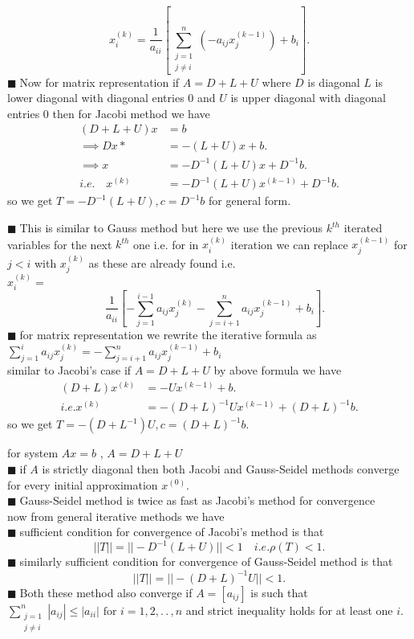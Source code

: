 \documentclass[11pt]{extarticle}
\newcommand{\ck}{.\,.\,}
\newcommand{\sm}[2]{\displaystyle\sum_{#1}^{#2}}
\newcommand{\tbx}[2][]{
\begin{tcolorbox}[enhanced,breakable,size=small,colback=black!2!white,title={#1},arc is angular, arc=1.5mm,drop fuzzy shadow]
	#2
\end{tcolorbox}
}
\newcommand{\y}{$\blacksquare\;$}
\begin{document}
\begin{multicols}{2}
{				\[ x_i^{(k)}=\frac{ 1 }{a_{ii}} \left[\sm{\substack{j=1 \\ j\neq i}}{n}(-a_{ij}x_j^{(k-1)}) +b_i\right].\]
				 \y Now for matrix representation if $ A=D+L+U $ where $ D $ is diagonal $ L $ is lower diagonal with diagonal entries $ 0 $ and $ U $ is upper diagonal with diagonal entries $ 0 $ then for Jacobi method we have 
				 \begin{align*}
				 	(D+L+U)x&=b\\
				 	\implies Dx*&= -(L+U)x+b.\\
				 	\implies x&=-D^{-1}(L+U)x+D^{-1}b.\\
				 	i.e. \quad x^{(k)}&=-D^{-1}(L+U)x^{(k-1)}+D^{-1}b.
				 	\end{align*}  
			 	so we get $ T=-D^{-1}(L+U),c=D^{-1}b $ for general form.}
				 \tbx[Gauss-Seidel Method]{ \y This is similar to Gauss method but here we use the previous $ k^{th} $ iterated variables for the next $ k^{th} $ one  i.e. for in $ x_i^{(k)} $ iteration we can replace $ x_j^{(k-1)} $ for $ j<i $ with $ x_j^{(k)} $ as these are already found i.e.\\
				 	 $x_i^{(k)}=$
				 \[\quad \frac{ 1 }{a_{ii}} \left[-\sm{j=1}{i-1}a_{ij}x_j^{(k)}-\sm{j=i+1}{n}a_{ij}x_j^{(k-1)}+b_i\right].\] 
				 \y for matrix representation we rewrite the iterative formula as \\
				 $\sm{j=1}{i}a_{ij}x_j^{(k)}=-\sm{j=i+1}{n}a_{ij}x_j^{(k-1)}+b_i$\\
				 similar to Jacobi's case if $ A=D+L+U $ by above formula we have 
				{ \small
					\begin{align*}
				 	(D+L)x^{(k)}&=-Ux^{(k-1)}+b.\\
				 	i.e. x^{(k)}&= -(D+L)^{-1}Ux^{(k-1)}+(D+L)^{-1}b.
				 	\end{align*}}
			 	so we get $ T=-(D+L^{-1})U,c=(D+L)^{-1}b. $ }
			 	\tbx{ for system $ Ax=b $ , $ A=D+L+U $ \\
			 		\y if $  A$ is strictly diagonal then both Jacobi and Gauss-Seidel methods converge for every initial approximation $ x^{(0)}. $ \\
			 		\y  Gauss-Seidel method is twice as fast as Jacobi's method for convergence \\
			 		now from general iterative methods we have \\
			 		\y sufficient condition for convergence of Jacobi's method is that 
			 		\[||T||=||-D^{-1}(L+U)||<1\quad i.e. \rho(T)<1.\]
			 		\y similarly  sufficient condition for convergence of Gauss-Seidel method is that 
			 		\[ ||T||=||-(D+L)^{-1}U||<1.\]
			 		\y Both these method also converge if $ A =[a_{ij}]$ is such that \\
			 		 $ \sm{\substack{j=1\\ j\neq i}}{n}|a_{ij}|\leq |a_{ii}| \text{ for } i=1,2,\ck,n $ and strict inequality holds for at least one $ i $.   }
	\end{multicols}
	
\end{document}
